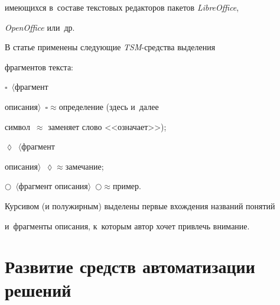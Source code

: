 имеющихся в~со\-ста\-ве текс\-то\-вых редакторов пакетов \textit{LibreOffice}, 


\textit{OpenOffice} или~др. 


  


  В статье применены следующие \textit{TSM}-сред\-ст\-ва выделения 


фрагментов текста:







  


  $\square$~$\langle$фрагмент 


описания$\rangle$~$\square$\;$\approx$\;определение (здесь и~далее 


символ~$\approx$ заменяет слово <<означает>>);


  


  $\lozenge$~$\langle$фрагмент 


 описания$\rangle$~$\lozenge$\;$\approx$\;за\-ме\-ча\-ние;


  


  $\bigcirc$~$\langle$фрагмент описания$\rangle$~$\bigcirc$\;$\approx$\;пример.


  




  


  Курсивом (и полужирным) выделены первые вхождения названий понятий 


и~фрагменты описания, к~которым автор хочет привлечь внимание. 





\vspace*{-5pt}


  


  \section{Развитие средств автоматизации решений}


  


\vspace*{-4pt}


  


